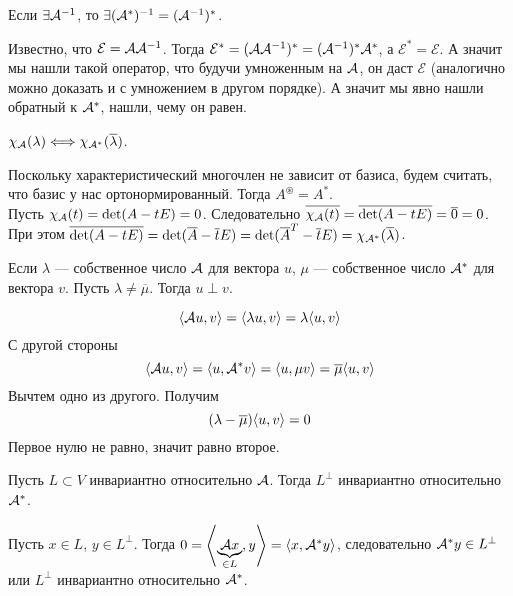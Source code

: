 \documentclass{article}
\newcommand{\id}{{\mathcal{E}}}
\begin{document}
\begin{itemize}
\begin{Proof}
        \end{Proof}
        \thm Если $\exists{\mathcal{A}}^{-1}$, то $\exists({\mathcal{A}}^*)^{-1}=({\mathcal{A}}^{-1})^*$.
        \begin{Proof}
            Известно, что $\id=\scriptA\scriptA^{-1}$. Тогда $\id^*=(\scriptA\scriptA^{-1})^*=(\scriptA^{-1})^*\scriptA^*$, а $\id^*=\id$. А значит мы нашли такой оператор, что будучи умноженным на ${\mathcal{A}}$, он даст $\id$ (аналогично можно доказать и с умножением в другом порядке). А значит мы явно нашли обратный к ${\mathcal{A}}^*$, нашли, чему он равен.
        \end{Proof}
        \thm $\chi_{\mathcal{A}}(\lambda)\Longleftrightarrow\chi_{{\mathcal{A}}^*}(\overline\lambda)$.
        \begin{Proof}
            Поскольку характеристический многочлен не зависит от базиса, будем считать, что базис у нас ортонормированный. Тогда $A^\circledast=A^*$.\\
            Пусть $\chi_{\mathcal{A}}(t)=\det(A-tE)=0$. Следовательно $\overline{\chi_{\mathcal{A}}(t)}=\overline{\det(A-tE)}=\overline0=0$. При этом $\overline{\det(A-tE)}=\det(\overline A-\overline tE)=\det({\overline A}^T-\overline tE)=\chi_{{\mathcal{A}}^*}(\overline\lambda)$.
        \end{Proof}
        \thm Если $\lambda$ --- собственное число ${\mathcal{A}}$ для вектора $u$, $\mu$ --- собственное число ${\mathcal{A}}^*$ для вектора $v$. Пусть $\lambda\neq\overline\mu$. Тогда $u\perp v$.
        \begin{Proof}
            $$
            {\left\langle{{\mathcal{A}}u},{v}\right\rangle}={\left\langle{\lambda u},{v}\right\rangle}=\lambda{\left\langle{u},{v}\right\rangle}
            $$
            С другой стороны
            $$
            {\left\langle{{\mathcal{A}}u},{v}\right\rangle}={\left\langle{u},{{\mathcal{A}}^*v}\right\rangle}={\left\langle{u},{\mu v}\right\rangle}=\overline\mu{\left\langle{u},{v}\right\rangle}
            $$
            Вычтем одно из другого. Получим
            $$
            (\lambda-\overline\mu){\left\langle{u},{v}\right\rangle}=0
            $$
            Первое нулю не равно, значит равно второе.
        \end{Proof}
        \thm Пусть $L\subset V$ инвариантно относительно ${\mathcal{A}}$. Тогда $L^\perp$ инвариантно относительно ${\mathcal{A}}^*$.
        \begin{Proof}
            Пусть $x\in L$, $y\in L^\perp$. Тогда $0={\left\langle{\underbrace{{\mathcal{A}}x}_{\in L}},{y}\right\rangle}={\left\langle{x},{{\mathcal{A}}^*y}\right\rangle}$, следовательно ${\mathcal{A}}^*y\in L^\perp$ или $L^\perp$ инвариантно относительно ${\mathcal{A}}^*$.
        \end{Proof}
    \end{itemize}
\end{document}
